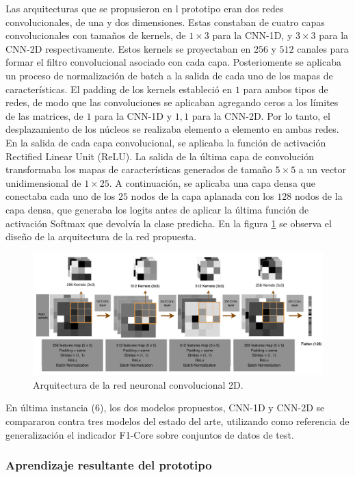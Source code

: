 \documentclass{uathesis-es}
\begin{document}
Las arquitecturas que se propusieron en l prototipo eran dos redes convolucionales, de una y dos dimensiones. Estas constaban de cuatro capas convolucionales con tamaños de kernels, de $1 \times 3$ para la CNN-1D, y $3 \times 3$ para la CNN-2D respectivamente. Estos kernels se proyectaban en $256$ y $512$ canales para formar el filtro convolucional asociado con cada capa. Posteriomente se aplicaba un proceso de normalización de batch a la salida de cada uno de los mapas de características. El padding de los kernels estableció en $1$ para ambos tipos de redes, de modo que las convoluciones se aplicaban agregando ceros a los límites de las matrices, de $1$ para la CNN-1D y ${1, 1}$ para la CNN-2D. Por lo tanto, el desplazamiento de los núcleos se realizaba elemento a elemento en ambas redes. En la salida de cada capa convolucional, se aplicaba la función de activación Rectified Linear Unit  (ReLU). La salida de la última capa de convolución transformaba los mapas de características generados de tamaño $5 \times 5$ a un vector unidimensional de $1 \times 25$. A continuación, se aplicaba una capa densa que conectaba cada uno de los $25$ nodos de la capa aplanada con los $128$ nodos de la capa densa, que generaba los logits antes de aplicar la última función de activación Softmax que devolvía la clase predicha. En la figura \ref{TASPCNNIMAGE} se observa el diseño de la arquitectura de la red propuesta.

\begin{figure}[H]
	\centering
	\includegraphics[width=15cm]{Figures/1stPaper/TASPCNN.png}
	\caption{Arquitectura de la red neuronal convolucional 2D.}
	\label{TASPCNNIMAGE}
\end{figure}

En última instancia (6), los dos modelos propuestos, CNN-1D y CNN-2D se compararon contra tres modelos del estado del arte, utilizando como referencia de generalización el indicador F1-Core sobre conjuntos de datos de test.


\subsubsection*{Aprendizaje resultante del prototipo}
\end{document}
